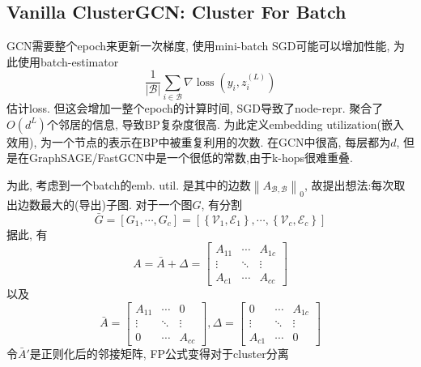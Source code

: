 \documentclass{article}
\begin{document}
\subsection{Vanilla ClusterGCN: Cluster For Batch}
    GCN需要整个epoch来更新一次梯度, 使用mini-batch SGD可能可以增加性能, 为此使用batch-estimator
    \begin{equation}
        \frac{1}{|\mathcal{B}|} \sum_{i \in \mathcal{B}} \nabla \operatorname{loss}\left(y_{i}, z_{i}^{(L)}\right)
    \end{equation}
    估计loss. 但这会增加一整个epoch的计算时间, SGD导致了node-repr. 聚合了$O(d^L)$个邻居的信息, 导致BP复杂度很高. 为此定义embedding utilization(嵌入效用), 为一个节点的表示在BP中被重复利用的次数. 在GCN中很高, 每层都为$d$, 但是在GraphSAGE/FastGCN中是一个很低的常数,由于k-hops很难重叠.

    为此, 考虑到一个batch的emb. util. 是其中的边数$\left\|A_{\mathcal{B}, \mathcal{B}}\right\|_{0}$, 故提出想法:每次取出边数最大的(导出)子图. 对于一个图$G$, 有分割
    \begin{equation}
        \bar{G}=\left[G_{1}, \cdots, G_{c}\right]=\left[\left\{\mathcal{V}_{1}, \mathcal{E}_{1}\right\}, \cdots,\left\{\mathcal{V}_{c}, \mathcal{E}_{c}\right\}\right]
    \end{equation}
    据此, 有
    \begin{equation}
        A=\bar{A}+\Delta=\left[\begin{array}{ccc}
        A_{11} & \cdots & A_{1 c} \\
        \vdots & \ddots & \vdots \\
        A_{c 1} & \cdots & A_{c c}
        \end{array}\right]
    \end{equation}
    以及
    \begin{equation}
        \bar{A}=\left[\begin{array}{ccc}
        A_{11} & \cdots & 0 \\
        \vdots & \ddots & \vdots \\
        0 & \cdots & A_{c c}
        \end{array}\right], \Delta=\left[\begin{array}{ccc}
        0 & \cdots & A_{1 c} \\
        \vdots & \ddots & \vdots \\
        A_{c 1} & \cdots & 0
        \end{array}\right]
    \end{equation}
    令$\bar{A}'$是正则化后的邻接矩阵, FP公式变得对于cluster分离
\end{document}
